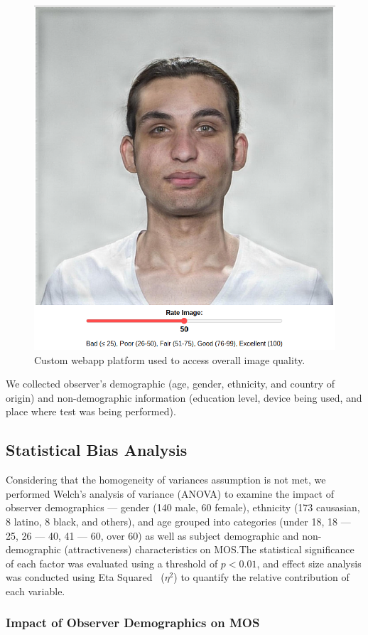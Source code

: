 \begin{figure}[!htbp]
    \centering
    \includegraphics[width=0.7\linewidth]{images/webapp.png}
    \caption{Custom webapp platform used to access overall image quality.}\label{fig:platform}
\end{figure}

We collected observer's demographic (age, gender, ethnicity, and country of origin) and non-demographic information (education level, device being used, and place where test was being performed).

\subsection{Statistical Bias Analysis}

Considering that the homogeneity of variances assumption is not met, we performed Welch's analysis of variance (ANOVA) to examine the impact of observer demographics --- gender (140 male, 60 female), ethnicity (173 causasian, 8 latino, 8 black, and others), and age grouped into categories (under 18, 18 --- 25, 26 --- 40, 41 --- 60, over 60) as well as subject demographic and non-demographic (attractiveness) characteristics on MOS.\@ The statistical significance of each factor was evaluated using a threshold of $p < 0.01$, and effect size analysis was conducted using Eta Squared~\cite{cohen1988statistical} ($\eta^2$) to quantify the relative contribution of each variable.

\subsubsection{Impact of Observer Demographics on MOS}

